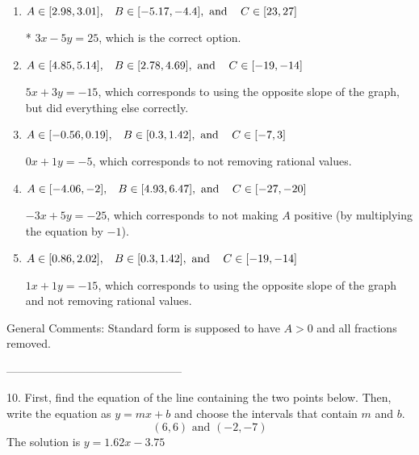 \documentclass{extbook}[14pt]
\begin{document}
\begin{enumerate}[label=\Alph*.] 
\item $ A \in [2.98, 3.01], \hspace{3mm} B \in [-5.17, -4.4], \text{ and } \hspace{3mm} C \in [23, 27] $ 

 * $3x - 5y = 25$, which is the correct option. 
\item $ A \in [4.85, 5.14], \hspace{3mm} B \in [2.78, 4.69], \text{ and } \hspace{3mm} C \in [-19, -14] $ 

  $5x + 3y = -15$, which corresponds to using the opposite slope of the graph, but did everything else correctly. 
\item $ A \in [-0.56, 0.19], \hspace{3mm} B \in [0.3, 1.42], \text{ and } \hspace{3mm} C \in [-7, 3] $ 

  $0x + 1y = -5$, which corresponds to not removing rational values. 
\item $ A \in [-4.06, -2], \hspace{3mm} B \in [4.93, 6.47], \text{ and } \hspace{3mm} C \in [-27, -20] $ 

  $-3x + 5y = -25$, which corresponds to not making $A$ positive (by multiplying the equation by $-1$). 
\item $ A \in [0.86, 2.02], \hspace{3mm} B \in [0.3, 1.42], \text{ and } \hspace{3mm} C \in [-19, -14] $ 

  $1x + 1y = -15$, which corresponds to using the opposite slope of the graph and not removing rational values. 
\end{enumerate} 
 
General Comments: Standard form is supposed to have $A > 0$ and all fractions removed.

-----------------------------------------------

10. First, find the equation of the line containing the two points below. Then, write the equation as $ y=mx+b $ and choose the intervals that contain $m$ and $b$.
\[ (6, 6) \text{ and } (-2, -7) \] 
The solution is $ y = 1.62x - 3.75 $ 
\end{document}
